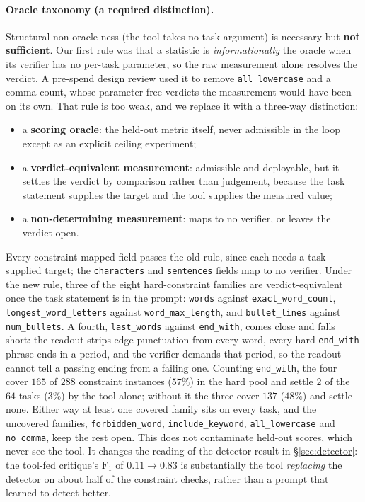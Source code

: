 \documentclass[11pt]{article}
\begin{document}
\paragraph{Oracle taxonomy (a required distinction).}
Structural non-oracle-ness (the tool takes no task argument) is necessary but
\textbf{not sufficient}. Our first rule was that a statistic is \emph{informationally} the
oracle when its verifier has no per-task parameter, so the raw measurement alone resolves the
verdict. A pre-spend design review used it to remove \texttt{all\_lowercase} and a comma count,
whose parameter-free verdicts the measurement would have been on its own. That rule is too weak,
and we replace it with a three-way distinction:
\begin{itemize}\itemsep0pt
\item a \textbf{scoring oracle}: the held-out metric itself, never admissible in the loop except
as an explicit ceiling experiment;
\item a \textbf{verdict-equivalent measurement}: admissible and deployable, but it settles the
verdict by comparison rather than judgement, because the task statement supplies the target
and the tool supplies the measured value;
\item a \textbf{non-determining measurement}: maps to no verifier, or leaves the verdict open.
\end{itemize}
Every constraint-mapped field passes the old rule, since each needs a task-supplied target; the
\texttt{characters} and \texttt{sentences} fields map to no verifier. Under the
new rule, three of the eight hard-constraint families are verdict-equivalent once the task
statement is in the prompt: \texttt{words} against \texttt{exact\_word\_count},
\texttt{longest\_word\_letters} against \texttt{word\_max\_length}, and \texttt{bullet\_lines}
against \texttt{num\_bullets}. A fourth, \texttt{last\_words} against \texttt{end\_with}, comes
close and falls short: the readout strips edge punctuation from every word, every hard
\texttt{end\_with} phrase ends in a period, and the verifier demands that period, so the readout
cannot tell a passing ending from a failing one. Counting \texttt{end\_with}, the four cover $165$
of $288$ constraint instances ($57\%$) in the hard pool and settle $2$ of the $64$ tasks ($3\%$)
by the tool alone; without it the three cover $137$ ($48\%$) and settle none. Either way at least
one covered family sits on every task, and the uncovered families, \texttt{forbidden\_word},
\texttt{include\_keyword}, \texttt{all\_lowercase} and \texttt{no\_comma}, keep the rest open.
This does not contaminate
held-out scores, which never see the tool. It changes the reading of the detector
result in \S\ref{sec:detector}: the tool-fed critique's $\mathrm{F}_1$ of $0.11 \to 0.83$ is
substantially the tool \emph{replacing} the detector on about half of the constraint checks,
rather than a prompt that learned to detect better.
\end{document}
